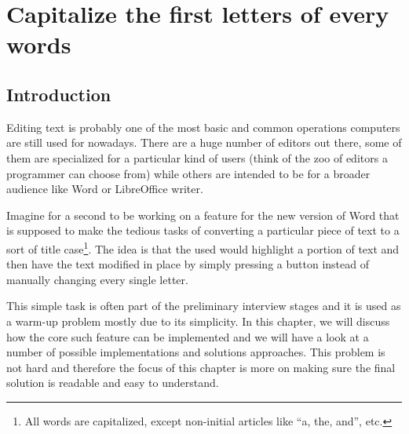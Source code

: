 %

\chapter{Capitalize the first letters of every words}
\label{ch:capitalize_words_first_letter}
\section*{Introduction}
Editing text is probably one of the most basic and common operations computers are still used for nowadays. There are a huge number of editors out there, some of them are specialized for a particular kind of users (think of the zoo of editors a programmer can choose from) while others are intended to be for a broader audience like Word or LibreOffice writer. 

Imagine for a second to be working on a feature for the new version of Word that is supposed to make the tedious tasks of converting a particular piece of text to a sort of title case\footnote{All words are capitalized, except non-initial articles like “a, the, and”, etc.}. The idea is that the used would highlight a portion of text and then have the text modified in place by simply pressing a button instead of manually changing every single letter. 

This simple task is often part of the preliminary interview stages and it is used as a warm-up problem mostly due to its simplicity. 
In this chapter, we will discuss how the core such feature can be implemented and we will have a look at a number of possible implementations and solutions approaches. This problem is not hard and therefore the focus of this chapter is more on making sure the final solution is readable and easy to understand.

